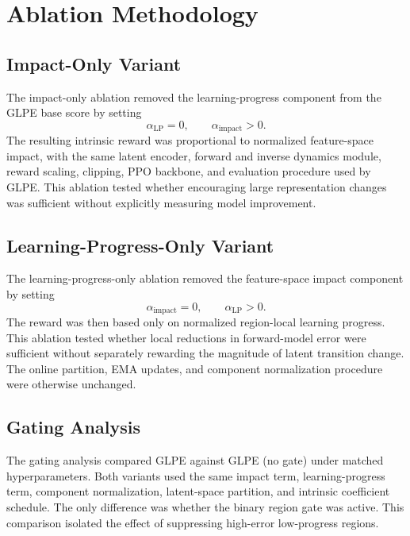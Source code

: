 \section{Ablation Methodology}
\label{sec:methodology_ablation_methodology}

\subsection{Impact-Only Variant}
\label{subsec:methodology_impact_only_variant}

The impact-only ablation removed the learning-progress component from the GLPE base score by setting
\begin{equation}
    \alpha_{\mathrm{LP}}=0,
    \qquad
    \alpha_{\mathrm{impact}}>0.
\end{equation}
The resulting intrinsic reward was proportional to normalized feature-space impact, with the same latent encoder, forward and inverse dynamics module, reward scaling, clipping, PPO backbone, and evaluation procedure used by GLPE.
This ablation tested whether encouraging large representation changes was sufficient without explicitly measuring model improvement.

\subsection{Learning-Progress-Only Variant}
\label{subsec:methodology_learning_progress_only_variant}

The learning-progress-only ablation removed the feature-space impact component by setting
\begin{equation}
    \alpha_{\mathrm{impact}}=0,
    \qquad
    \alpha_{\mathrm{LP}}>0.
\end{equation}
The reward was then based only on normalized region-local learning progress.
This ablation tested whether local reductions in forward-model error were sufficient without separately rewarding the magnitude of latent transition change.
The online partition, EMA updates, and component normalization procedure were otherwise unchanged.

\subsection{Gating Analysis}
\label{subsec:methodology_gating_analysis}

The gating analysis compared GLPE against GLPE (no gate) under matched hyperparameters.
Both variants used the same impact term, learning-progress term, component normalization, latent-space partition, and intrinsic coefficient schedule.
The only difference was whether the binary region gate was active.
This comparison isolated the effect of suppressing high-error low-progress regions.

